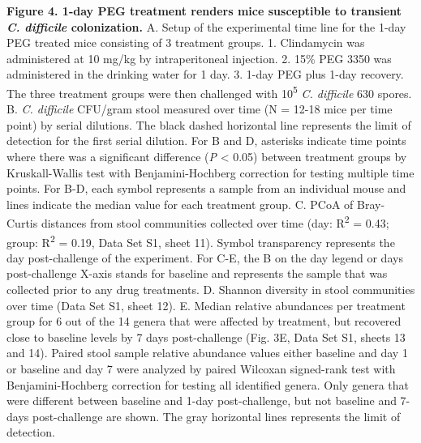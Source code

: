 \documentclass[
  11pt,
]{article}
\begin{document}
\textbf{Figure 4. 1-day PEG treatment renders mice susceptible to
transient \emph{C. difficile} colonization.} A. Setup of the
experimental time line for the 1-day PEG treated mice consisting of 3
treatment groups. 1. Clindamycin was administered at 10 mg/kg by
intraperitoneal injection. 2. 15\% PEG 3350 was administered in the
drinking water for 1 day. 3. 1-day PEG plus 1-day recovery. The three
treatment groups were then challenged with 10\textsuperscript{5}
\emph{C. difficile} 630 spores. B. \emph{C. difficile} CFU/gram stool
measured over time (N = 12-18 mice per time point) by serial dilutions.
The black dashed horizontal line represents the limit of detection for
the first serial dilution. For B and D, asterisks indicate time points
where there was a significant difference (\emph{P} \textless{} 0.05)
between treatment groups by Kruskall-Wallis test with Benjamini-Hochberg
correction for testing multiple time points. For B-D, each symbol
represents a sample from an individual mouse and lines indicate the
median value for each treatment group. C. PCoA of Bray-Curtis distances
from stool communities collected over time (day: R\textsuperscript{2} =
0.43; group: R\textsuperscript{2} = 0.19, Data Set S1, sheet 11). Symbol
transparency represents the day post-challenge of the experiment. For
C-E, the B on the day legend or days post-challenge X-axis stands for
baseline and represents the sample that was collected prior to any drug
treatments. D. Shannon diversity in stool communities over time (Data
Set S1, sheet 12). E. Median relative abundances per treatment group for
6 out of the 14 genera that were affected by treatment, but recovered
close to baseline levels by 7 days post-challenge (Fig. 3E, Data Set S1,
sheets 13 and 14). Paired stool sample relative abundance values either
baseline and day 1 or baseline and day 7 were analyzed by paired
Wilcoxan signed-rank test with Benjamini-Hochberg correction for testing
all identified genera. Only genera that were different between baseline
and 1-day post-challenge, but not baseline and 7-days post-challenge are
shown. The gray horizontal lines represents the limit of detection.
\end{document}
